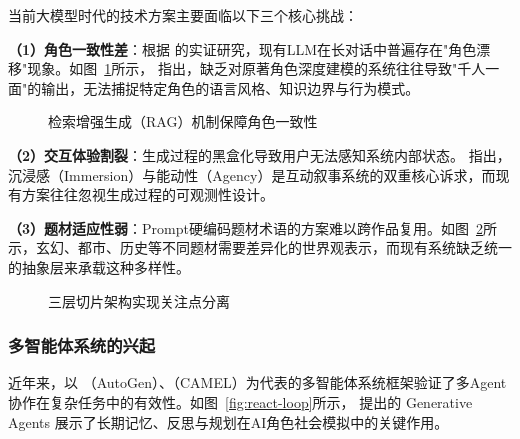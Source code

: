 \documentclass[UTF8,oneside,a4paper]{ctexart}
\begin{document}
当前大模型时代的技术方案主要面临以下三个核心挑战：

\textbf{（1）角色一致性差}：根据 \citet{amadaeus2025} 的实证研究，现有LLM在长对话中普遍存在"角色漂移"现象。如图~\ref{fig:rag-consistency}所示，\citet{liu2025npc} 指出，缺乏对原著角色深度建模的系统往往导致"千人一面"的输出，无法捕捉特定角色的语言风格、知识边界与行为模式。

\begin{figure}[H]
\centering
{}
\caption{检索增强生成（RAG）机制保障角色一致性}
\label{fig:rag-consistency}
\end{figure}

\textbf{（2）交互体验割裂}：生成过程的黑盒化导致用户无法感知系统内部状态。\citet{wu2025interactive} 指出，沉浸感（Immersion）与能动性（Agency）是互动叙事系统的双重核心诉求，而现有方案往往忽视生成过程的可观测性设计。

\textbf{（3）题材适应性弱}：Prompt硬编码题材术语的方案难以跨作品复用。如图~\ref{fig:layered-arch}所示，玄幻、都市、历史等不同题材需要差异化的世界观表示，而现有系统缺乏统一的抽象层来承载这种多样性。

\begin{figure}[H]
\centering
{}
\caption{三层切片架构实现关注点分离}
\label{fig:layered-arch}
\end{figure}

\subsubsection{多智能体系统的兴起}

近年来，以 \citet{wu2023autogen}（AutoGen）、\citet{li2023camel}（CAMEL）为代表的多智能体系统框架验证了多Agent协作在复杂任务中的有效性。如图~\ref{fig:react-loop}所示，\citet{park2023generative} 提出的 Generative Agents 展示了长期记忆、反思与规划在AI角色社会模拟中的关键作用。
\end{document}
